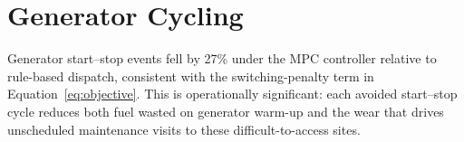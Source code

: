 \section{Generator Cycling}
Generator start--stop events fell by 27\% under the MPC controller relative to rule-based
dispatch, consistent with the switching-penalty term in Equation~\eqref{eq:objective}. This is
operationally significant: each avoided start--stop cycle reduces both fuel wasted on
generator warm-up and the wear that drives unscheduled maintenance visits to these
difficult-to-access sites.
